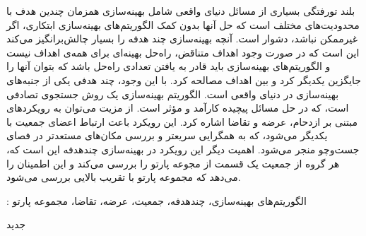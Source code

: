


\pagestyle{empty}

\begin{وسط‌چین}
\end{وسط‌چین}


‌بلند
‌تورفتگی بسیاری از مسائل دنیای واقعی شامل بهینه‌سازی همزمان چندین هدف با محدودیت‌های مختلف است که حل آنها بدون کمک الگوریتم‌های بهینه‌سازی ابتکاری، اگر غیرممکن نباشد، دشوار است. آنچه بهینه‌سازی چند هدفه را بسیار چالش‌برانگیز می‌کند این است که در صورت وجود اهداف متناقض، راه‌حل بهینه‌ای برای همه‌ی اهداف نیست و الگوریتم‌های بهینه‌سازی باید قادر به یافتن تعدادی راه‌حل باشد که بتوان آنها را جایگزین یکدیگر کرد و بین اهداف مصالحه کرد.  با این وجود، چند هدفی یکی از جنبه‌های بهینه‌سازی در دنیای واقعی است.
الگوریتم بهینه‌سازی  یک روش جستجوی تصادفی است، که در حل مسائل پیچیده کارآمد و مؤثر است.
از مزیت   می‌توان به رویکردهای مبتنی بر ازدحام، عرضه و تقاضا اشاره کرد. این رویکرد باعث ارتباط اعضای جمعیت با یکدیگر می‌شود، که به همگرایی سریعتر و بررسی مکان‌های مستعدتر در فصای جست‌وچو منجر می‌شود. اهمیت دیگر این رویکرد در بهینه‌سازی چندهدفه این است که، هر گروه از جمعیت یک قسمت از مجوعه پارتو را بررسی می‌کند و این اطمینان را می‌دهد که مجموعه پارتو با تقریب بالایی بررسی می‌شود.

 : 
 الگوریتم‌های بهینه‌سازی، چندهدفه، جمعیت، عرضه، تقاضا، مجموعه پارتو

‌جدید
